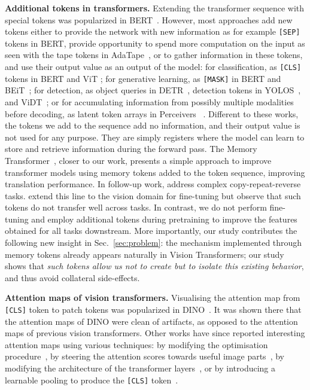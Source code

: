 \textbf{Additional tokens in transformers.}
Extending the transformer sequence with special tokens was popularized in BERT~\citep{devlin2018bert}. 
However, most approaches add new tokens either to provide the network with new information as for example \texttt{[SEP]} tokens in BERT, provide opportunity to spend more computation on the input as seen with the tape tokens in AdaTape~\citep{xue2023adaptive}, or to gather information in these tokens, and use their output value as an output of the model:
for classification, as \texttt{[CLS]} tokens in BERT and ViT \citep{dosovitskiy2020image};
for generative learning, as \texttt{[MASK]} in BERT and BEiT~\citep{bao2021beit};
for detection, as object queries in DETR~\citep{carion2020end}, detection tokens in YOLOS~\citep{fang2021you}, and ViDT~\citep{song2021vidt};
or for accumulating information from possibly multiple modalities before decoding, as latent token arrays in Perceivers ~\citep{jaegle2021perceiver,Jaegle2021PerceiverIO}.
Different to these works, the tokens we add to the sequence add no information, and their output value is not used for any purpose. 
They are simply registers where the model can learn to store and retrieve information during the forward pass.
The Memory Transformer~\citep{burtsev2020memory}, closer to our work, presents a simple approach to improve transformer models using memory tokens added to the token sequence, improving translation performance. 
In follow-up work, \cite{bulatov2022recurrent} address complex copy-repeat-reverse tasks. 
\cite{sandler2022fine} extend this line to the vision domain for fine-tuning but observe that such tokens do not transfer well across tasks.
In contrast, we do not perform fine-tuning and employ additional tokens during pretraining to improve the features obtained for all tasks downstream.
More importantly, our study contributes the following new insight in Sec.~\ref{sec:problem}: the mechanism implemented through memory tokens already appears naturally in Vision Transformers; our study shows that \textit{such tokens allow us not to create but to isolate this existing behavior}, and thus avoid collateral side-effects.

\textbf{Attention maps of vision transformers.}
Visualising the attention map from \texttt{[CLS]} token to patch tokens was popularized in DINO~\citep{caron2021emerging}.
It was shown there that the attention maps of DINO were clean of artifacts, as opposed to the attention maps of previous vision transformers.
Other works have since reported interesting attention maps using various techniques: by modifying the optimisation procedure~\citep{chen2021vision}, by steering the attention scores towards useful image parts~\citep{shi2023toast}, by modifying the architecture of the transformer layers~\citep{yu2023emergence}, or by introducing a learnable pooling to produce the \texttt{[CLS]} token~\citep{psomas2023keep}.